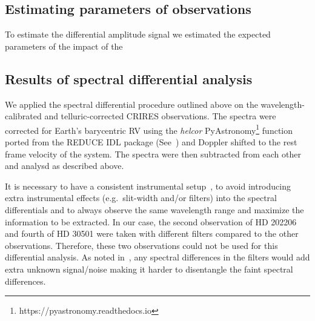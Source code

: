 







    \subsection{Estimating parameters of observations}
    To estimate the differential amplitude signal we estimated the expected parameters of the impact of the

    
    

    \subsection{Results of spectral differential analysis}

    \label{subsec:results}
    We applied the spectral differential procedure outlined above on the wavelength-calibrated and telluric-corrected {CRIRES} observations. The spectra were corrected for Earth's barycentric {RV} using the \emph{helcor} PyAstronomy\footnote{https://pyastronomy.readthedocs.io} function ported from the REDUCE IDL package (See~\citet[][]{piskunov_new_2002}) and Doppler shifted to the rest frame velocity of the system. The spectra were then subtracted from each other and analysd as described above.

    It is necessary to have a consistent instrumental setup~\citet{ferluga_separating_1997}, to avoid introducing extra instrumental effects (e.g.\ slit-width and/or filters) into the spectral differentials and to always observe the same wavelength range and maximize the information to be extracted. In our case, the second observation of {HD 202206} and fourth of {HD 30501} were taken with different filters compared to the other observations. Therefore, these two observations could not be used for this differential analysis. As noted in~\citep{hadrava_disentangling_2009}, any spectral differences in the filters would add extra unknown signal/noise making it harder to disentangle the faint spectral differences.


